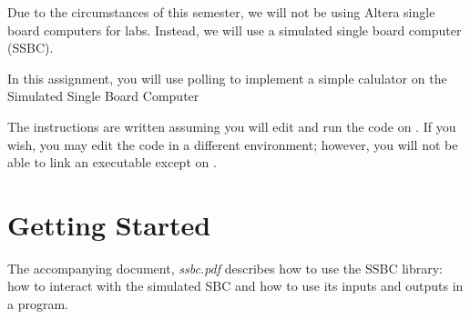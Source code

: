 

\usepackage{enumitem}
\usepackage{graphicx}
\usepackage{media9}
\usepackage{addfont}

\renewcommand{\labnumber}{9b}
\renewcommand{\labname}{Polling to Detect Inputs on Simulated Hardware}
\renewcommand{\shortlabname}{ssbclab-polling}
\renewcommand{\collaborationrules}{\individualeffort}
\renewcommand{\duedate}{Week of April 19, before the start of your lab section}
\startdocument


Due to the circumstances of this semester, we will not be using Altera
single board computers for labs. Instead, we will use a simulated single
board computer (SSBC).

In this assignment, you will use polling to implement a simple calulator on the
Simulated Single Board Computer

The instructions are written assuming you will edit and run the code on
\runtimeenvironment. If you wish, you may edit the code in a different
environment; however, you will not be able to link an executable except on
\runtimeenvironment.

\section{Getting Started}

The accompanying document, \textit{ssbc.pdf} describes how to use the SSBC
library: how to interact with the simulated SBC and how to use its inputs and
outputs in a program.


